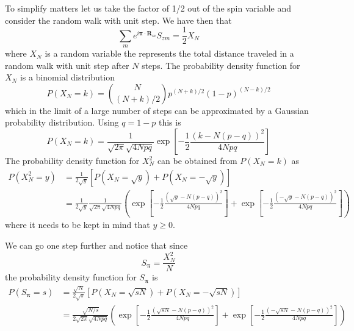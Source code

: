 \documentclass[11pt,letter]{article}
\newcommand{\bv}[1]{\ensuremath{\bm{#1}}}
\begin{document}
To simplify matters let us take the factor of 1/2 out of the spin variable and
consider the random walk with unit step.   We have then that
\begin{equation} 
       \sum_{m}  
      e^{ i \bv{\pi} \cdot \bv{R}_{m} }    
      S_{zm} =   \frac{1}{2} X_{N} 
\end{equation}
where $X_{N}$ is a random variable the represents the total distance traveled
in a random walk with unit step after $N$ steps.   The probability density
function for $X_{N}$ is a binomial distribution 
\begin{equation}
  P(X_{N}=k) = \binom{N}{ (N+k)/2 } p^{(N+k)/2} (1-p)^{(N-k)/2} 
\end{equation}
which in the limit of a large number of steps can be approximated by a Gaussian
probability distribution.  Using $q=1-p$ this is
\begin{equation}
  P(X_{N}=k) =  \frac{1}{\sqrt{2\pi}\sqrt{4 N pq}} 
\exp\left[ -\frac{1}{2}\frac{(k-N(p-q))^{2}}{4 N pq }  \right]
\end{equation}
The probability density function for $X_{N}^{2}$ can be obtained from $P(X_{N}=k)$ as 
\begin{equation}
\begin{split}
  P( X_{N}^{2} = y ) & = \frac{1}{2\sqrt{y}} [P( X_{N}=\sqrt{y})+P(X_{N}=-\sqrt{y})] \\
   & =
 \frac{1}{2\sqrt{y}} 
   \frac{1}{\sqrt{2\pi}\sqrt{4 N pq}} 
  \left(
\exp\left[ -\frac{1}{2}\frac{(\sqrt{y}-N(p-q))^{2}}{4 N pq }  \right] + 
\exp\left[ -\frac{1}{2}\frac{(-\sqrt{y}-N(p-q))^{2}}{4 N pq }  \right]  \right)
\end{split}
\end{equation}
where it needs to be kept in mind that $y\geq 0$.   

We can go one step further and notice that since 
\begin{equation}
  S_{\bv{\pi}} = \frac{ X_{N}^{2} }{N} 
\end{equation} 
the probability density function for $S_{\bv{\pi}}$ is 
\begin{equation}
\begin{split}
  P( S_{\bv{\pi}} = s ) & = \frac{\sqrt{N}}{2\sqrt{s}} 
     \left[ P( X_{N}=\sqrt{sN}) + P( X_{N}=-\sqrt{sN}) \right] \\
   & =
   \frac{\sqrt{N/s}}{2\sqrt{2\pi}\sqrt{4 N pq}}
   \left( 
    \exp\left[ -\frac{1}{2}\frac{(\sqrt{sN}-N(p-q))^{2}}{4 N pq }  \right]
 +   \exp\left[ -\frac{1}{2}\frac{(-\sqrt{sN}-N(p-q))^{2}}{4 N pq }  \right]
   \right)
\end{split}
\end{equation}
\end{document}
